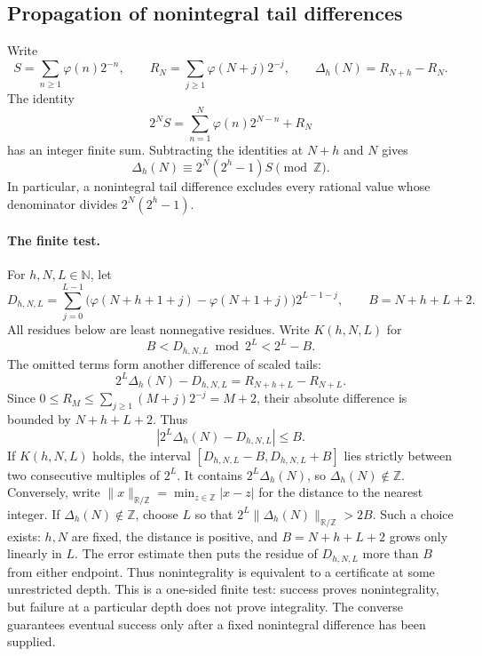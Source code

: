 \documentclass[11pt]{article}
\theoremstyle{plain}
\theoremstyle{definition}
\theoremstyle{remark}
\newcommand{\N}{\mathbb{N}}
\newcommand{\Z}{\mathbb{Z}}
\newcommand{\R}{\mathbb{R}}
\newcommand{\ph}{\varphi}
\begin{document}
\subsection{Propagation of nonintegral tail differences}\label{long249:r3-ray}
Write
\[
 S=\sum_{n\ge1}\ph(n)2^{-n},\qquad
 R_N=\sum_{j\ge1}\ph(N+j)2^{-j},\qquad
 \Delta_h(N)=R_{N+h}-R_N.
\]
The identity
\[
 2^NS=\sum_{n=1}^N\ph(n)2^{N-n}+R_N
\]
has an integer finite sum. Subtracting the identities at $N+h$ and $N$
gives
\begin{equation}\label{long249:r3-tail-phase}
 \Delta_h(N)\equiv2^N(2^h-1)S\pmod\Z.
\end{equation}
In particular, a nonintegral tail difference excludes every
rational value whose denominator divides $2^N(2^h-1)$.
\paragraph{The finite test.}
For $h,N,L\in\N$, let
\[
 D_{h,N,L}=\sum_{j=0}^{L-1}
   \bigl(\ph(N+h+1+j)-\ph(N+1+j)\bigr)2^{L-1-j},
 \qquad B=N+h+L+2.
\]
All residues below are least nonnegative residues. Write $K(h,N,L)$ for
\[
 B<D_{h,N,L}\bmod2^L<2^L-B.
\]
The omitted terms form another difference of scaled tails:
\[
 2^L\Delta_h(N)-D_{h,N,L}=R_{N+h+L}-R_{N+L}.
\]
Since $0\le R_M\le\sum_{j\ge1}(M+j)2^{-j}=M+2$, their absolute
difference is bounded by $N+h+L+2$.
Thus
\begin{equation}\label{long249:r3-tail-error}
 |2^L\Delta_h(N)-D_{h,N,L}|\le B.
\end{equation}
If $K(h,N,L)$ holds, the interval
$[D_{h,N,L}-B,D_{h,N,L}+B]$ lies strictly between two consecutive
multiples of $2^L$. It contains $2^L\Delta_h(N)$, so
$\Delta_h(N)\notin\Z$.
Conversely, write $\|x\|_{\R/\Z}=\min_{z\in\Z}|x-z|$ for the distance to
the nearest integer. If $\Delta_h(N)\notin\Z$, choose $L$ so that
$2^L\|\Delta_h(N)\|_{\R/\Z}>2B$. Such a choice exists: $h,N$ are fixed,
the distance is positive, and $B=N+h+L+2$ grows only linearly in $L$.
The error estimate then puts the residue of $D_{h,N,L}$ more than $B$
from either endpoint. Thus nonintegrality is equivalent to a certificate
at some unrestricted depth. This is a one-sided finite test: success
proves nonintegrality, but failure at a particular depth does not prove
integrality. The converse guarantees eventual success only after a
fixed nonintegral difference has been supplied.
\end{document}

